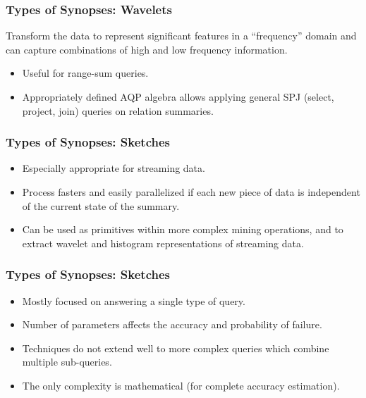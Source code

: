 \documentclass{beamer}
\begin{document}
\begin{frame}
\frametitle{Types of Synopses: Wavelets}
Transform the data to represent significant features in a “frequency” domain and can capture combinations of high and low frequency information.\pause
\begin{itemize}
\item{Useful for range-sum queries.}
\item{Appropriately defined AQP algebra allows applying general SPJ (select, project, join) queries on relation summaries.}
\end{itemize}
\end{frame}

\begin{frame}
\frametitle{Types of Synopses: Sketches}
\begin{itemize}
\item{Especially appropriate for streaming data.}
\item{Process fasters and easily parallelized if each new piece of data is independent of the current state of the summary.}
\item{Can be used as primitives within more complex mining operations, and to extract wavelet and histogram representations of streaming data.}
\end{itemize}
\end{frame}

\begin{frame}
\frametitle{Types of Synopses: Sketches}
\begin{itemize}
\item{Mostly focused on answering a single type of query.}
\item{Number of parameters affects the accuracy and probability of failure.}
\item{Techniques do not extend well to more complex queries which combine multiple sub-queries.}
\item{The only complexity is mathematical (for complete accuracy estimation).}
\end{itemize}
\end{frame}
\end{document}
